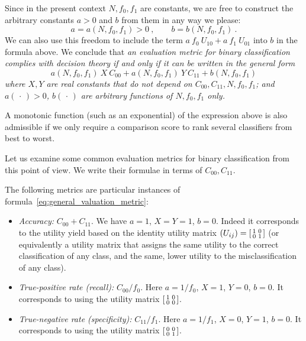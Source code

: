 \documentclass[\ifafour a4paper,12pt,\else a5paper,10pt,\fi%
onecolumn,oneside,article,%
british%
]{memoir}
\theoremstyle{remark}
\theoremstyle{innote}
\newcommand*{\dotv}{\mathord{\,\cdot\,}}%
\renewcommand*{\|}[1][]{\nonscript\:#1\vert\nonscript\:\mathopen{}}
\newcommand*{\itemyes}{{\fontencoding{U}\fontfamily{pzd}\selectfont\symbol{51}}}
\newcommand*{\cx}{X}
\newcommand*{\cy}{Y}
\newcommand*{\sumatrix}[4]{\begin{bsmallmatrix*}[r]#1&#2\\#3&#4\end{bsmallmatrix*}}
\begin{document}
Since in the present context $N, f_{0}, f_{1}$ are constants, we are free to construct the arbitrary constants $a > 0$ and $b$ from them in any way we please:
\begin{equation}
  \label{eq:constants_functions}
  a = a(N, f_{0}, f_{1}) > 0\ , \qquad
  b = b(N, f_{0}, f_{1}) \ .
\end{equation}
We can also use this freedom to include the term $a\ f_{0}\ U_{10} + a\ f_{1}\ U_{01}$ into $b$ in the formula above. We conclude that \emph{an evaluation metric for binary classification complies with decision theory if and only if it can be written in the general form}
\begin{equation}
  \label{eq:general_valuation_metric}
  a(N, f_{0}, f_{1})\ \cx\ C_{00} +
  a(N, f_{0}, f_{1})\ \cy\  C_{11} +
  b(N, f_{0}, f_{1})
\end{equation}
\emph{where $\cx,\cy$ are real constants that do not depend on $C_{00}, C_{11}, N, f_{0}, f_{1}$; and $a(\dotv)>0$, $b(\dotv)$ are arbitrary functions of $N, f_{0}, f_{1}$ only.}

A monotonic function (such as an exponential) of the expression above is also admissible if we only require a comparison score to rank several classifiers from best to worst.

Let us examine some common evaluation metrics for binary classification from this point of view. We write their formulae in terms of $C_{00}, C_{11}$.

The following metrics are particular instances of formula~\eqref{eq:general_valuation_metric}:
\begin{itemize}
\item[\itemyes] \emph{Accuracy:} $C_{00}+C_{11}$. We have $a=1$, $\cx=\cy=1$, $b=0$. Indeed it corresponds to the utility yield based on the identity utility matrix $(U_{ij}) = \sumatrix{ 1}{0}{0}{1 }$ (or equivalently a utility matrix that assigns the same utility to the correct classification of any class, and the same, lower utility to the misclassification of any class).
  
\item[\itemyes] \emph{True-positive rate (recall):} $C_{00}/f_{0}$. Here $a=1/f_{0}$, $\cx=1$, $\cy=0$, $b=0$. It corresponds to using the utility matrix $\sumatrix{ 1}{0}{0}{0 }$. 

\item[\itemyes] \emph{True-negative rate (specificity):} $C_{11}/f_{1}$. Here $a=1/f_{1}$, $\cx=0$, $\cy=1$, $b=0$. It corresponds to using the utility matrix $\sumatrix{ 0}{0}{0}{1 }$. 
\end{itemize}
\end{document}
